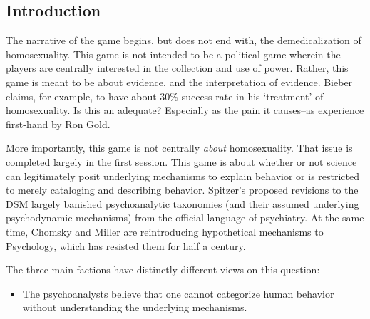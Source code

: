 \begin{refsection}
\def\mysubtitle{The struggle for legitimacy of psychology and psychiatry in the 1970's\\ \large Instructor's Manual}

\maketitle
\newpage
\tableofcontents
\newpage
\listoftables
\newpage
\listoffigures
\newpage

\renewcommand*{\thechapter}{\arabic{chapter}}
\renewcommand*{\thesection}{\arabic{section}}

\setcounter{chapter}{0}
\mainmatter

\pagebreak 

\chapter{Introduction}
\label{introduction}

The narrative of the game begins, but does not end with, the demedicalization of homosexuality. This game is not intended to be a political game wherein the players are centrally interested in the collection and use of power. Rather, this game is meant to be about evidence, and the interpretation of evidence. Bieber claims, for example, to have about 30\% success rate in his `treatment' of homosexuality. Is this an adequate? Especially as the pain it causes--as experience first-hand by Ron Gold.

More importantly, this game is not centrally \emph{about} homosexuality. That issue is completed largely in the first session. This game is about whether or not science can legitimately posit underlying mechanisms to explain behavior or is restricted to merely cataloging and describing behavior. Spitzer's proposed revisions to the DSM largely banished psychoanalytic taxonomies (and their assumed underlying psychodynamic mechanisms) from the official language of psychiatry. At the same time, Chomsky and Miller are reintroducing hypothetical mechanisms to Psychology, which has resisted them for half a century.

The three main factions have distinctly different views on this question: 

\begin{itemize}
\item The psychoanalysts believe that one cannot categorize human behavior without understanding the underlying mechanisms. 


\end{itemize}
\end{refsection}
